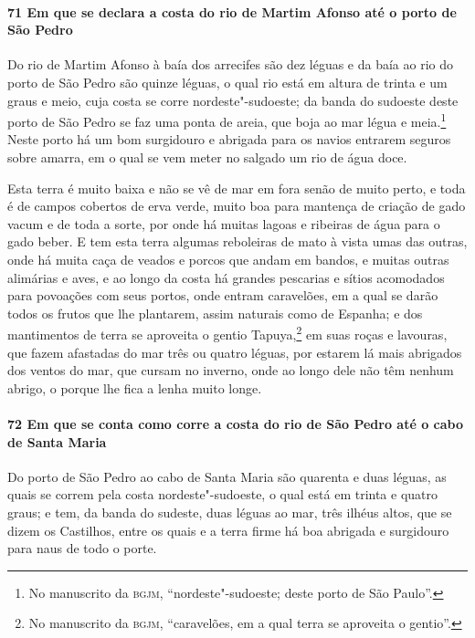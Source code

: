 \paragraph{71 Em que se declara a costa do rio de Martim Afonso até o porto de São Pedro}

Do rio de Martim Afonso à baía dos arrecifes são dez léguas e da baía ao rio do porto de
São Pedro são quinze léguas, o qual rio está em altura de trinta e um graus e meio, cuja
costa se corre nordeste"-sudoeste; da banda do sudoeste deste porto de São Pedro se faz uma
ponta de areia, que boja ao mar légua e meia.\footnote{ No manuscrito da \textsc{bgjm},
``nordeste"-sudoeste; deste porto de São Paulo''.} Neste porto há um bom surgidouro e
abrigada para os navios entrarem seguros sobre amarra, em o qual se vem meter no salgado
um rio de água doce.

Esta terra é muito baixa e não se vê de mar em fora senão de muito perto, e toda é de
campos cobertos de erva verde, muito boa para mantença de criação de gado vacum e de toda
a sorte, por onde há muitas lagoas e ribeiras de água para o gado beber. E tem esta terra
algumas reboleiras de mato à vista umas das outras, onde há muita caça de veados e porcos
que andam em bandos, e muitas outras alimárias e aves, e ao longo da costa há grandes
pescarias e sítios acomodados para povoações com seus portos, onde entram caravelões, em a
qual se darão todos os frutos que lhe plantarem, assim naturais como de Espanha; e dos
mantimentos de terra se aproveita o gentio Tapuya,\footnote{ No manuscrito da
\textsc{bgjm}, ``caravelões, em a qual terra se aproveita o gentio''.} em suas roças e
lavouras, que fazem afastadas do mar três ou quatro léguas, por estarem lá mais abrigados
dos ventos do mar, que cursam no inverno, onde ao longo dele não têm nenhum abrigo, o
porque lhe fica a lenha muito longe.

\paragraph{72 Em que se conta como corre a costa do rio de São Pedro até o cabo de Santa
Maria}

Do porto de São Pedro ao cabo de Santa Maria são quarenta e duas léguas, as quais se
correm pela costa nordeste"-sudoeste, o qual está em trinta e quatro graus; e tem, da banda
do sudeste, duas léguas ao mar, três ilhéus altos, que se dizem os Castilhos, entre os
quais e a terra firme há boa abrigada e surgidouro para naus de todo o porte.

